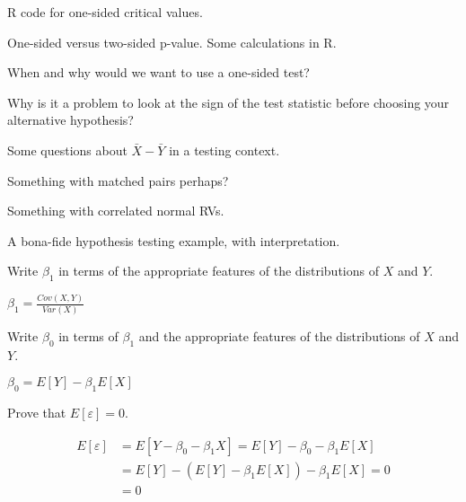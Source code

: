 \documentclass[addpoints,12pt]{exam}
\begin{document}
\begin{questions}
\question R code for one-sided critical values.

\question One-sided versus two-sided p-value. Some calculations in R.

\question When and why would we want to use a one-sided test?

\question Why is it a problem to look at the sign of the test statistic before choosing your alternative hypothesis?


\question Some questions about $\bar{X} - \bar{Y}$ in a testing context.

\question Something with matched pairs perhaps?

\question Something with correlated normal RVs.

\question A bona-fide hypothesis testing example, with interpretation.





\question Write $\beta_1$ in terms of the appropriate features of the distributions of $X$ and $Y$.
\begin{solution}
  $\beta_1 = \displaystyle\frac{Cov(X,Y)}{Var(X)}$
\end{solution}

\question Write $\beta_0$ in terms of $\beta_1$ and the appropriate features of the distributions of $X$ and $Y$.
\begin{solution}
  $\beta_0 = E[Y] - \beta_1 E[X]$
\end{solution}

\question Prove that $E[\varepsilon] = 0$.
\begin{solution}
  \begin{align*}
    E[\varepsilon] &= E[Y - \beta_0 - \beta_1 X] = E[Y] - \beta_0 - \beta_1 E[X]\\
    &= E[Y] - \left( E[Y] - \beta_1 E[X] \right) - \beta_1 E[X] = 0\\
    &=0
  \end{align*}
\end{solution}


\end{questions}
\end{document}
